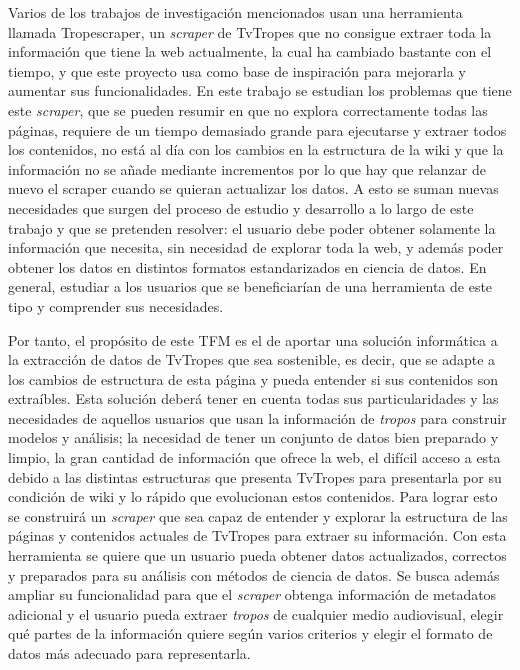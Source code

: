 Varios de los trabajos de investigación mencionados usan una herramienta llamada
Tropescraper, un \textit{scraper} de TvTropes que no consigue extraer toda la
información que tiene la web actualmente, la cual ha cambiado bastante con el
tiempo, y que este proyecto usa como base de inspiración para mejorarla y
aumentar sus funcionalidades. En este trabajo se estudian los problemas que
tiene este \textit{scraper}, que se pueden resumir en que no explora
correctamente todas las páginas, requiere de un tiempo demasiado grande para
ejecutarse y extraer todos los contenidos, no está al día con los cambios en la
estructura de la wiki y que la información no se añade mediante incrementos por
lo que hay que relanzar de nuevo el scraper cuando se quieran actualizar los
datos. A esto se suman nuevas necesidades que surgen del proceso de estudio y
desarrollo a lo largo de este trabajo y que se pretenden resolver: el usuario
debe poder obtener solamente la información que necesita, sin necesidad de
explorar toda la web, y además poder obtener los datos en distintos formatos
estandarizados en ciencia de datos. En general, estudiar a los usuarios que se
beneficiarían de una herramienta de este tipo y comprender sus necesidades.

Por tanto, el propósito de este TFM es el de aportar una solución informática a
la extracción de datos de TvTropes que sea sostenible, es decir, que se adapte a
los cambios de estructura de esta página y pueda entender si sus contenidos son
extraíbles. Esta solución deberá tener en cuenta todas sus particularidades y
las necesidades de aquellos usuarios que usan la información de \textit{tropos}
para construir modelos y análisis; la necesidad de tener un conjunto de datos
bien preparado y limpio, la gran cantidad de información que ofrece la web, el
difícil acceso a esta debido a las distintas estructuras que presenta TvTropes
para presentarla por su condición de wiki y lo rápido que evolucionan estos
contenidos. Para lograr esto se construirá un \textit{scraper} que sea capaz de
entender y explorar la estructura de las páginas y contenidos actuales de
TvTropes para extraer su información. Con esta herramienta se quiere que un
usuario pueda obtener datos actualizados, correctos y preparados para su
análisis con métodos de ciencia de datos. Se busca además ampliar su
funcionalidad para que el \textit{scraper} obtenga información de metadatos
adicional y el usuario pueda extraer \textit{tropos} de cualquier medio
audiovisual, elegir qué partes de la información quiere según varios criterios y
elegir el formato de datos más adecuado para representarla.

